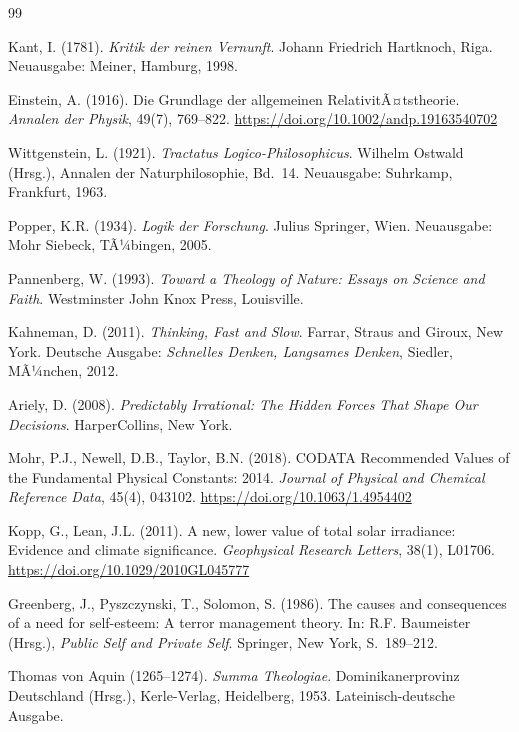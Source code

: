 ﻿\documentclass[a4paper,12pt]{article}
\theoremstyle{definition}
\begin{document}
\newpage
\begin{thebibliography}{99}

Kant, I. (1781). \textit{Kritik der reinen Vernunft}. Johann Friedrich Hartknoch, Riga. Neuausgabe: Meiner, Hamburg, 1998.

Einstein, A. (1916). Die Grundlage der allgemeinen RelativitÃ¤tstheorie. \textit{Annalen der Physik}, 49(7), 769--822. \url{https://doi.org/10.1002/andp.19163540702}

Wittgenstein, L. (1921). \textit{Tractatus Logico-Philosophicus}. Wilhelm Ostwald (Hrsg.), Annalen der Naturphilosophie, Bd.~14. Neuausgabe: Suhrkamp, Frankfurt, 1963.

Popper, K.R. (1934). \textit{Logik der Forschung}. Julius Springer, Wien. Neuausgabe: Mohr Siebeck, TÃ¼bingen, 2005.

Pannenberg, W. (1993). \textit{Toward a Theology of Nature: Essays on Science and Faith}. Westminster John Knox Press, Louisville.

Kahneman, D. (2011). \textit{Thinking, Fast and Slow}. Farrar, Straus and Giroux, New York. Deutsche Ausgabe: \textit{Schnelles Denken, Langsames Denken}, Siedler, MÃ¼nchen, 2012.

Ariely, D. (2008). \textit{Predictably Irrational: The Hidden Forces That Shape Our Decisions}. HarperCollins, New York.

Mohr, P.J., Newell, D.B., Taylor, B.N. (2018). CODATA Recommended Values of the Fundamental Physical Constants: 2014. \textit{Journal of Physical and Chemical Reference Data}, 45(4), 043102. \url{https://doi.org/10.1063/1.4954402}

Kopp, G., Lean, J.L. (2011). A new, lower value of total solar irradiance: Evidence and climate significance. \textit{Geophysical Research Letters}, 38(1), L01706. \url{https://doi.org/10.1029/2010GL045777}

Greenberg, J., Pyszczynski, T., Solomon, S. (1986). The causes and consequences of a need for self-esteem: A terror management theory. In: R.F. Baumeister (Hrsg.), \textit{Public Self and Private Self}. Springer, New York, S.~189--212.

Thomas von Aquin (1265--1274). \textit{Summa Theologiae}. Dominikanerprovinz Deutschland (Hrsg.), Kerle-Verlag, Heidelberg, 1953. Lateinisch-deutsche Ausgabe.


\end{thebibliography}
\end{document}
